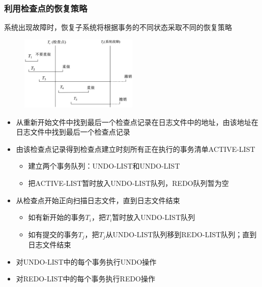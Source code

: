 \subsubsection{利用检查点的恢复策略}
系统出现故障时，恢复子系统将根据事务的不同状态采取不同的恢复策略 
\begin{figure}[H]
    \vspace{-0.5em}
	\centering
	\includegraphics[width=0.5\textwidth]{images/10.5.4.2}
    \vspace{-1em}
\end{figure}
\begin{itemize}
    \item 从重新开始文件中找到最后一个检查点记录在日志文件中的地址，由该地址在日志文件中找到最后一个检查点记录
    \item 由该检查点记录得到检查点建立时刻所有正在执行的事务清单ACTIVE-LIST
    \begin{itemize}
        \item 建立两个事务队列：UNDO-LIST和UNDO-LIST
        \item 把ACTIVE-LIST暂时放入UNDO-LIST队列，REDO队列暂为空
    \end{itemize}
    \item 从检查点开始正向扫描日志文件，直到日志文件结束
    \begin{itemize}
        \item 如有新开始的事务$T_i$，把$T_i$暂时放入UNDO-LIST队列
        \item 如有提交的事务$T_j$，把$T_j$从UNDO-LIST队列移到REDO-LIST队列；直到日志文件结束
    \end{itemize}
    \item 对UNDO-LIST中的每个事务执行UNDO操作
    \item 对REDO-LIST中的每个事务执行REDO操作
\end{itemize}
